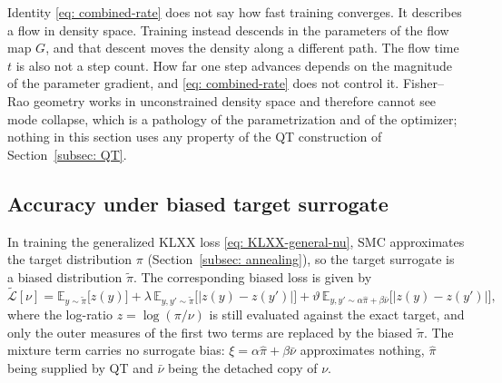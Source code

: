 \documentclass{article}
\begin{document}
\begin{remark}
	{\color{blue}Identity \eqref{eq: combined-rate}} does not say how fast training converges. It describes a flow in density space. Training instead descends in the parameters of the flow map $G$, and that descent moves the density along a different path. The flow time $t$ is also not a step count. How far one step advances depends on the magnitude of the parameter gradient, and {\color{blue}\eqref{eq: combined-rate}} does not control it. {\color{blue}Fisher--Rao geometry works in unconstrained density space and therefore cannot see mode collapse, which is a pathology of the parametrization and of the optimizer; nothing in this section uses any property of the QT construction of Section~\ref{subsec: QT}.}
\end{remark}

\subsection{Accuracy under biased target surrogate}

In training the generalized KLXX loss \eqref{eq: KLXX-general-nu}, SMC approximates the target distribution $\pi$ (Section~\ref{subsec: annealing}), so the target surrogate is a biased distribution $\tilde\pi$. The corresponding biased loss is given by
\begin{equation}
	\tilde{\mathcal L}[\nu] = \mathbb E_{y\sim\tilde\pi}\big[z(y)\big] +  \lambda\, \mathbb E_{y,y'\sim\tilde\pi}\big[|z(y)-z(y')|\big] + \vartheta\, \mathbb E_{y,y'\sim \alpha\hat\pi+\beta\bar\nu}\big[|z(y)-z(y')|\big],
	\label{eq: KLXX-biased}
\end{equation}
where the log-ratio $z=\log(\pi/\nu)$ is still evaluated against the exact target, and only the outer measures of the first two terms are replaced  by the biased $\tilde\pi$. The mixture term carries no surrogate bias: $\xi=\alpha\hat\pi+\beta\bar\nu$ approximates nothing, $\hat\pi$ being supplied by QT and $\bar\nu$ being the detached copy of $\nu$.
\end{document}
